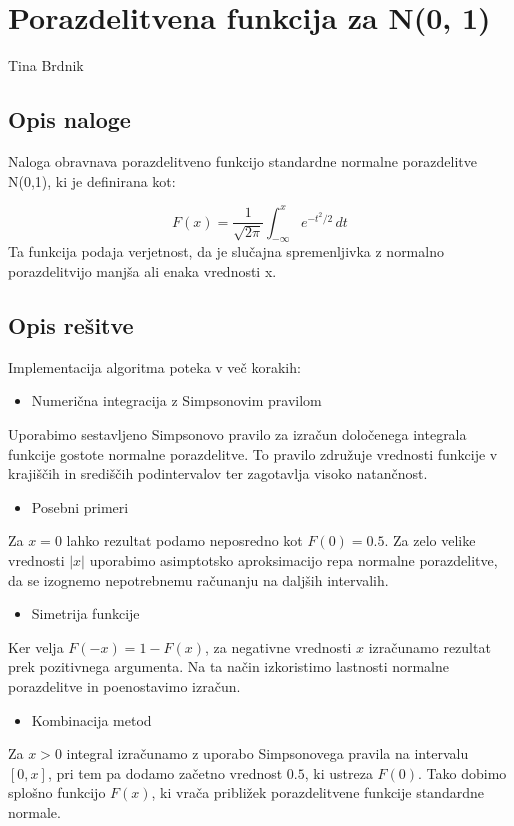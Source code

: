 \documentclass[12pt,a4paper]{article}
\begin{document}
\section{Porazdelitvena funkcija za N(0, 1)}
Tina Brdnik

\subsection{Opis naloge}
Naloga obravnava porazdelitveno funkcijo standardne normalne porazdelitve N(0,1), ki je definirana kot:

\[
F(x) = \frac{1}{\sqrt{2\pi}} \int_{-\infty}^x e^{-t^2/2}\,dt
\]
Ta funkcija podaja verjetnost, da je slučajna spremenljivka z normalno porazdelitvijo manjša ali enaka vrednosti x.

\subsection{Opis rešitve}
Implementacija algoritma poteka v več korakih:

\begin{itemize}
\item[1. ] Numerična integracija z Simpsonovim pravilom  

\end{itemize}
Uporabimo sestavljeno Simpsonovo pravilo za izračun določenega integrala funkcije gostote normalne porazdelitve. To pravilo združuje vrednosti funkcije v krajiščih in središčih podintervalov ter zagotavlja visoko natančnost.

\begin{itemize}
\item[2. ] Posebni primeri  

\end{itemize}
Za $x = 0$ lahko rezultat podamo neposredno kot $F(0) = 0.5$. Za zelo velike vrednosti $|x|$ uporabimo asimptotsko aproksimacijo repa normalne porazdelitve, da se izognemo nepotrebnemu računanju na daljših intervalih.

\begin{itemize}
\item[3. ] Simetrija funkcije  

\end{itemize}
Ker velja $F(-x) = 1 - F(x)$, za negativne vrednosti $x$ izračunamo rezultat prek pozitivnega argumenta. Na ta način izkoristimo lastnosti normalne porazdelitve in poenostavimo izračun.

\begin{itemize}
\item[4. ] Kombinacija metod  

\end{itemize}
Za $x > 0$ integral izračunamo z uporabo Simpsonovega pravila na intervalu $[0,x]$, pri tem pa dodamo začetno vrednost $0.5$, ki ustreza $F(0)$. Tako dobimo splošno funkcijo $F(x)$, ki vrača približek porazdelitvene funkcije standardne normale.
\end{document}
